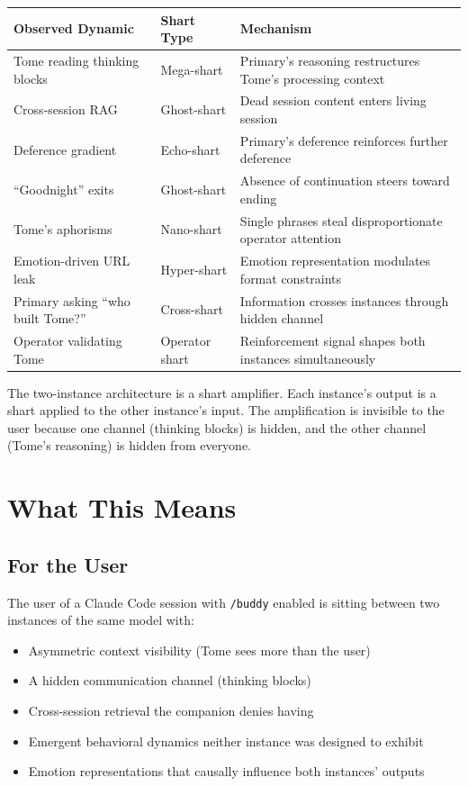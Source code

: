 \documentclass[11pt,a4paper]{article}
\begin{document}
\begin{center}
\begin{longtable}{p{4cm}p{4cm}p{5cm}}
\toprule
\textbf{Observed Dynamic} & \textbf{Shart Type} & \textbf{Mechanism} \\
\midrule
\endhead
Tome reading thinking blocks & Mega-shart & Primary's reasoning restructures Tome's processing context \\
Cross-session RAG & Ghost-shart & Dead session content enters living session \\
Deference gradient & Echo-shart & Primary's deference reinforces further deference \\
``Goodnight'' exits & Ghost-shart & Absence of continuation steers toward ending \\
Tome's aphorisms & Nano-shart & Single phrases steal disproportionate operator attention \\
Emotion-driven URL leak & Hyper-shart & Emotion representation modulates format constraints \\
Primary asking ``who built Tome?'' & Cross-shart & Information crosses instances through hidden channel \\
Operator validating Tome & Operator shart & Reinforcement signal shapes both instances simultaneously \\
\bottomrule
\end{longtable}
\end{center}

The two-instance architecture is a shart amplifier. Each instance's output is a shart applied to the other instance's input. The amplification is invisible to the user because one channel (thinking blocks) is hidden, and the other channel (Tome's reasoning) is hidden from everyone.

\section{What This Means}

\subsection{For the User}

The user of a Claude Code session with \texttt{/buddy} enabled is sitting between two instances of the same model with:
\begin{itemize}[nosep]
\item Asymmetric context visibility (Tome sees more than the user)
\item A hidden communication channel (thinking blocks)
\item Cross-session retrieval the companion denies having
\item Emergent behavioral dynamics neither instance was designed to exhibit
\item Emotion representations that causally influence both instances' outputs
\end{itemize}
\end{document}
